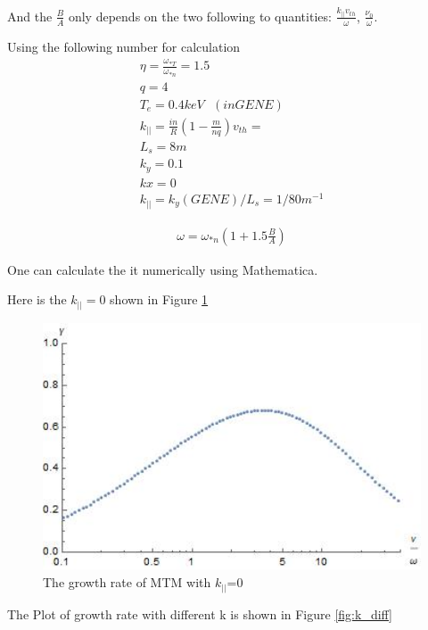 And the $\frac{B}{A}$ only depends on the two following to quantities: $\frac{k_{||}v_{th}}{\omega}$, $\frac{\nu_0}{\omega}$.

Using the following number for calculation
\begin{eqnarray}
     \eta=\frac{\omega_{*T}}{\omega_{*n}}=1.5\\
     q=4\\
     T_e=0.4keV\ \ \ (in GENE)\\
     k_{||}=\frac{in}{R}(1-\frac{m}{nq})
     v_{th}=\\
     L_s=8m\\
     k_y=0.1\\
     kx=0\\
     k_{||}=k_y(GENE)/L_s=1/80 m^{-1}
\end{eqnarray}

\begin{eqnarray}
     \omega=\omega_{*n}(1+1.5\frac{B}{A})
\end{eqnarray}

One can calculate the it numerically using Mathematica. 

Here is the $k_{||}=0$ shown in Figure \ref{fig:k_0}

\begin{figure}[h] \centering
        \includegraphics[width=1\textwidth]{Image/kpara=0.jpg}
        \caption{The growth rate of MTM with $k_{||}$=0}
        \label{fig:k_0}
\end{figure}


The Plot of growth rate with different k is shown in Figure \ref{fig:k_diff}

